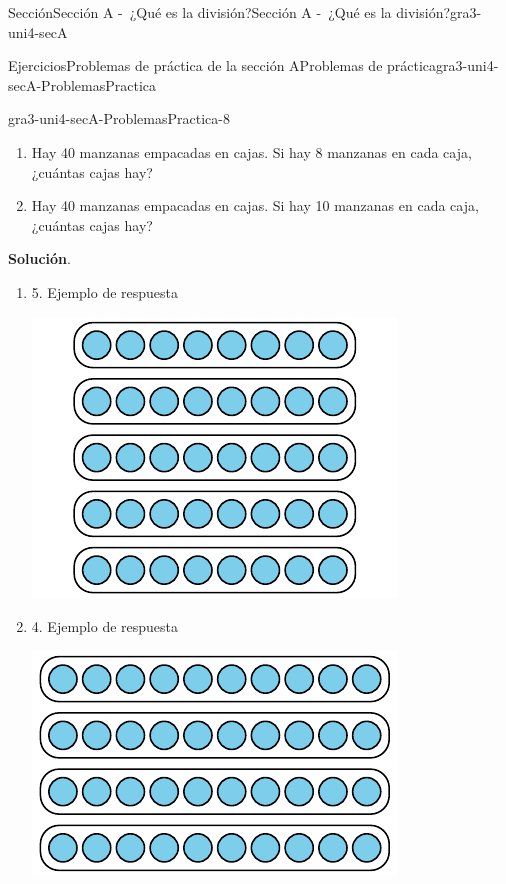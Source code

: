 \documentclass[oneside,10pt,]{article}
\newcommand{\blocktitlefont}{\relax}
\begin{document}
\begin{sectionptx}{Sección}{Sección A -~¿Qué es la división?}{}{Sección A -~¿Qué es la división?}{}{}{gra3-uni4-secA}
\begin{exercises-subsection}{Ejercicios}{Problemas de práctica de la sección A}{}{Problemas de práctica}{}{}{gra3-uni4-secA-ProblemasPractica}
\begin{divisionexercise}{6}{}{}{gra3-uni4-secA-ProblemasPractica-8}
\begin{enumerate}[label={(\alph*)}]
\item{}Hay 40 manzanas empacadas en cajas. Si hay 8 manzanas en cada caja, ¿cuántas cajas hay?%
\item{}Hay 40 manzanas empacadas en cajas. Si hay 10 manzanas en cada caja, ¿cuántas cajas hay?%
\end{enumerate}
%
\par\smallskip%
\noindent\textbf{\blocktitlefont Solución}.\hypertarget{gra3-uni4-secA-ProblemasPractica-8-2}{}\quad{}%
\begin{enumerate}[label={(\alph*)}]
\item{}5. Ejemplo de respuesta%
\begin{image}{0}{1}{0}{}%
\includegraphics[width=\linewidth]{external/svg-source/tikz-file-152430.pdf}
\end{image}%
\item{}4. Ejemplo de respuesta%
\begin{image}{0}{1}{0}{}%
\includegraphics[width=\linewidth]{external/svg-source/tikz-file-152431.pdf}

\end{image}
\end{enumerate}
\end{divisionexercise}
\end{exercises-subsection}
\end{sectionptx}
\end{document}
